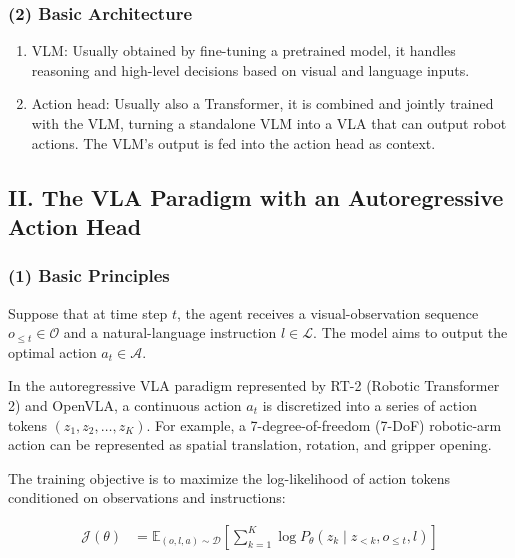 \hypertarget{basic-architecture}{%
\subsubsection{(2) Basic Architecture}\label{basic-architecture}}

\begin{enumerate}
\def\labelenumi{\arabic{enumi}.}
\item
  VLM: Usually obtained by fine-tuning a pretrained model, it handles reasoning and high-level decisions based on visual and language inputs.
\item
  Action head: Usually also a Transformer, it is combined and jointly trained with the VLM, turning a standalone VLM into a VLA that can output robot actions. The VLM's output is fed into the action head as context.
\end{enumerate}

\hypertarget{ii.-the-vla-paradigm-with-an-autoregressive-action-head}{%
\subsection{II. The VLA Paradigm with an Autoregressive Action Head}\label{ii.-the-vla-paradigm-with-an-autoregressive-action-head}}

\hypertarget{basic-principles}{%
\subsubsection{(1) Basic Principles}\label{basic-principles}}

Suppose that at time step \(t\), the agent receives a visual-observation sequence \(o_{\le t}\in\mathcal{O}\) and a natural-language instruction \(l\in\mathcal{L}\). The model aims to output the optimal action \(a_t\in\mathcal{A}\).

In the autoregressive VLA paradigm represented by RT-2 (Robotic Transformer 2) and OpenVLA, a continuous action \(a_t\) is discretized into a series of action tokens \((z_1,z_2,\ldots,z_K)\). For example, a 7-degree-of-freedom (7-DoF) robotic-arm action can be represented as spatial translation, rotation, and gripper opening.

The training objective is to maximize the log-likelihood of action tokens conditioned on observations and instructions:

\[
\begin{aligned}
\mathcal{J}(\theta)
&=
\mathbb{E}_{(o,l,a)\sim\mathcal{D}}
\left[
\sum_{k=1}^{K}
\log P_{\theta}(z_k\mid z_{<k}, o_{\le t}, l)
\right]
\end{aligned}
\]


